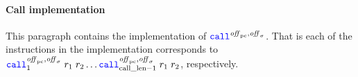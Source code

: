 \documentclass[a4paper]{article}
\begin{document}
\paragraph{Call implementation}
\label{par:call-impl}
This paragraph contains the implementation of $\scall{\offpc,\offsigma}{}{}$. That is each of the instructions in the implementation corresponds to $\scall[1]{\offpc,\offsigma}{r_1}{r_2} \dots \scall[\calllen-1]{\offpc,\offsigma}{r_1}{r_2}$, respectively.

\end{document}
